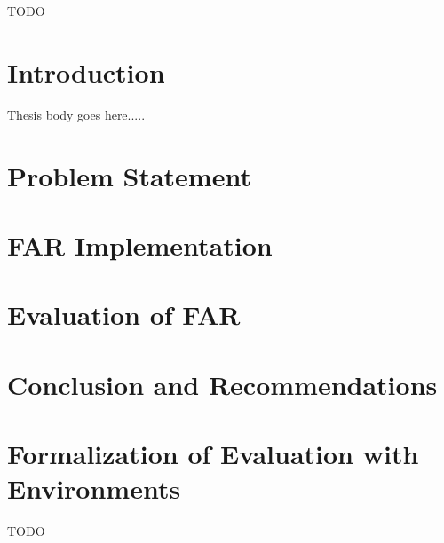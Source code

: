 \documentclass{article}
\makeatletter
\renewcommand\tableofcontents{%
  \@starttoc{toc}%
}
\renewcommand\listoffigures{%
  \@starttoc{lof}%
}
\makeatother
\begin{document}
\doublespacing








\tableofcontents{}

\clearpage{}

\clearpage{}
TODO

\listoffigures{}

\clearpage{}

\section{Introduction}
\label{sec:introduction}

Thesis body goes here.....

\section{Problem Statement}
\label{sec:prb_stmt}

\section{FAR Implementation}
\label{sec:far_impl}

\section{Evaluation of FAR}
\label{sec:far_eval}

\section{Conclusion and Recommendations}
\label{sec:concl}

\clearpage{}


\clearpage{}
\appendix{}

\section{Formalization of Evaluation with Environments}
\label{app:eval_env}

TODO
\end{document}
